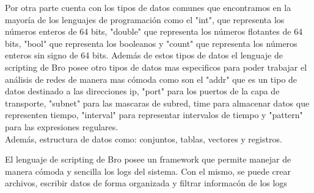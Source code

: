 \documentclass{article}
\begin{document}
Por otra parte cuenta con los tipos de datos comunes que encontramos en la mayor\'ia de los lenguajes de programaci\'on como el "int", que representa los n\'umeros enteros de 64 bits, "double" que representa los n\'umeros flotantes de 64 bits, "bool" que representa los booleanos y "count"  que representa los n\'umeros enteros sin signo de 64 bits. Adem\'as de estos tipos de datos el lenguaje de scripting de Bro posee otro tipos de datos  mas especificos para poder trabajar el an\'alisis de redes de manera mas c\'omoda como son el "addr" que es un tipo de datos destinado a las direcciones ip, "port" para los puertos de la capa de transporte, "subnet" para las mascaras de subred, time para almacenar datos que representen tiempo, "interval" para representar intervalos de tiempo y "pattern" para las expresiones regulares.\\

Adem\'as, estructura de datos como: conjuntos, tablas, vectores y registros.

El lenguaje de scripting de Bro posee un framework que permite manejar de manera c\'omoda y sencilla los logs del sistema. Con el mismo, se puede crear archivos, escribir datos de forma organizada y filtrar informac\'on de los logs\\
\end{document}

